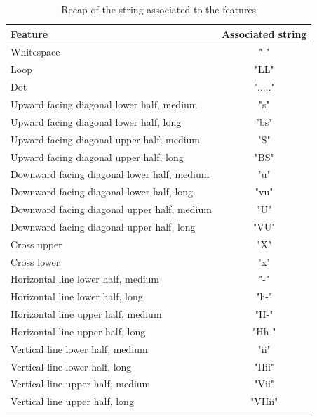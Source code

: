 \begin{table}[!htbp]
\centering
\footnotesize
\begin{tabular}{|l | c |} 
 \hline  \multicolumn{1}{|p{2cm}|}{\bfseries Feature}
 & \multicolumn{1}{p{2cm}|}{\centering\bfseries Associated string} \\ [0.5ex] 
 \hline\hline
 Whitespace & " " \\ \hline
 Loop & "LL"\\\hline
 Dot & "....."\\ \hline
 Upward facing diagonal lower half, medium & "s" \\ \hline
 Upward facing diagonal lower half, long & "bs"  \\\hline
 Upward facing diagonal upper half, medium & "S" \\ \hline
 Upward facing diagonal upper half, long & "BS" \\\hline
 Downward facing diagonal lower half, medium& "u"\\ \hline
 Downward facing diagonal lower half, long &"vu" \\ \hline
 Downward facing diagonal upper half, medium& "U" \\\hline
 Downward facing diagonal upper half, long &"VU" \\\hline
 Cross upper & "X"\\\hline
 Cross lower & "x"\\\hline
 Horizontal line lower half, medium & "-"\\\hline
  Horizontal line lower half, long & "h-"\\\hline
   Horizontal line upper half, medium & "H-"\\\hline
    Horizontal line upper half, long & "Hh-"\\\hline
 Vertical line lower half, medium & "ii"\\\hline
  Vertical line lower half, long & "IIii"\\\hline
   Vertical line upper half, medium & "Vii"\\\hline
    Vertical line upper half, long & "VIIii"\\ 
 \hline
\end{tabular}
\caption{Recap of the string associated to the features}
\label{features}
\end{table}



